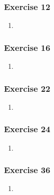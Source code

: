 \documentclass[a4paper]{article}
\newcommand{\ex}[1]{\subsubsection*{#1}}
\begin{document}
\ex{Exercise 12}

\begin{enumerate}[label=\alph*)]
    \item 
\end{enumerate}

\ex{Exercise 16}

\begin{enumerate}[label=\alph*)]
    \item 
\end{enumerate}

\ex{Exercise 22}

\begin{enumerate}[label=\alph*)]
    \item 
\end{enumerate}

\ex{Exercise 24}

\begin{enumerate}[label=\alph*)]
    \item 
\end{enumerate}

\ex{Exercise 36}

\begin{enumerate}[label=\alph*)]
    \item 
\end{enumerate}


%
\end{document}
